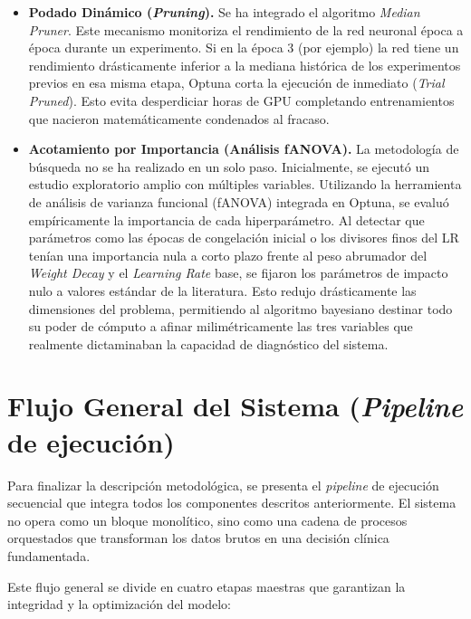 \begin{itemize}
	\item \textbf{Podado Dinámico (\textit{Pruning}).} Se ha integrado el algoritmo \textit{Median Pruner}. Este mecanismo monitoriza el rendimiento de la red neuronal época a época durante un experimento. Si en la época 3 (por ejemplo) la red tiene un rendimiento drásticamente inferior a la mediana histórica de los experimentos previos en esa misma etapa, Optuna corta la ejecución de inmediato (\textit{Trial Pruned}). Esto evita desperdiciar horas de GPU completando entrenamientos que nacieron matemáticamente condenados al fracaso.
	
	\item \textbf{Acotamiento por Importancia (Análisis fANOVA).} La metodología de búsqueda no se ha realizado en un solo paso. Inicialmente, se ejecutó un estudio exploratorio amplio con múltiples variables. Utilizando la herramienta de análisis de varianza funcional (fANOVA) integrada en Optuna, se evaluó empíricamente la importancia de cada hiperparámetro. Al detectar que parámetros como las épocas de congelación inicial o los divisores finos del LR tenían una importancia nula a corto plazo frente al peso abrumador del \textit{Weight Decay} y el \textit{Learning Rate} base, se fijaron los parámetros de impacto nulo a valores estándar de la literatura. Esto redujo drásticamente las dimensiones del problema, permitiendo al algoritmo bayesiano destinar todo su poder de cómputo a afinar milimétricamente las tres variables que realmente dictaminaban la capacidad de diagnóstico del sistema.
\end{itemize}

\section{Flujo General del Sistema (\textit{Pipeline} de ejecución)}

Para finalizar la descripción metodológica, se presenta el \textit{pipeline} de ejecución secuencial que integra todos los componentes descritos anteriormente. El sistema no opera como un bloque monolítico, sino como una cadena de procesos orquestados que transforman los datos brutos en una decisión clínica fundamentada.

Este flujo general se divide en cuatro etapas maestras que garantizan la integridad y la optimización del modelo:


